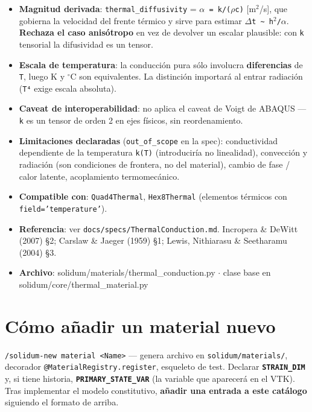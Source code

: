\documentclass[11pt,letterpaper,oneside]{report}
\begin{document}
\begin{itemize}
  \item \textbf{Magnitud derivada}: \texttt{thermal\_diffusivity} = \texttt{\ensuremath{\alpha} = k/(\ensuremath{\rho}c)} [m\ensuremath{^{2}}/s], que gobierna la velocidad del frente térmico y sirve para estimar \texttt{\ensuremath{\Delta}t \textasciitilde{} h\ensuremath{^{2}}/\ensuremath{\alpha}}. \textbf{Rechaza el caso anisótropo} en vez de devolver un escalar plausible: con \texttt{k} tensorial la difusividad es un tensor.
  \item \textbf{Escala de temperatura}: la conducción pura sólo involucra \textbf{diferencias} de \texttt{T}, luego K y \ensuremath{^{\circ}}C son equivalentes. La distinción importará al entrar radiación (\texttt{T⁴} exige escala absoluta).
  \item \textbf{Caveat de interoperabilidad}: no aplica el caveat de Voigt de ABAQUS --- \texttt{k} es un tensor de orden 2 en ejes físicos, sin reordenamiento.
  \item \textbf{Limitaciones declaradas} (\texttt{out\_of\_scope} en la spec): conductividad dependiente de la temperatura \texttt{k(T)} (introduciría no linealidad), convección y radiación (son condiciones de frontera, no del material), cambio de fase / calor latente, acoplamiento termomecánico.
  \item \textbf{Compatible con}: \texttt{Quad4Thermal}, \texttt{Hex8Thermal} (elementos térmicos con \texttt{field='temperature'}).
  \item \textbf{Referencia}: ver \texttt{docs/specs/ThermalConduction.md}. Incropera \& DeWitt (2007) §2; Carslaw \& Jaeger (1959) §1; Lewis, Nithiarasu \& Seetharamu (2004) §3.
  \item \textbf{Archivo}: solidum/materials/thermal\_conduction.py \ensuremath{\cdot} clase base en solidum/core/thermal\_material.py
\end{itemize}


\section{Cómo añadir un material nuevo}

\texttt{/solidum-new material <Name>} --- genera archivo en \texttt{solidum/materials/}, decorador \texttt{@MaterialRegistry.register}, esqueleto de test.
Declarar \textbf{\texttt{STRAIN\_DIM}} y, si tiene historia, \textbf{\texttt{PRIMARY\_STATE\_VAR}} (la variable que aparecerá en el VTK).
Tras implementar el modelo constitutivo, \textbf{añadir una entrada a este catálogo} siguiendo el formato de arriba.
\end{document}
